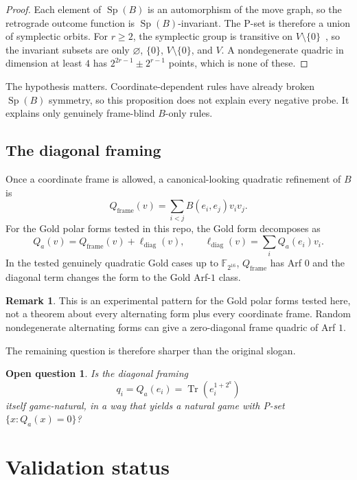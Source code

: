 \documentclass[11pt]{article}
\newtheorem*{question}{Open question}
\theoremstyle{definition}
\newtheorem{remark}{Remark}
\newcommand{\F}{\mathbb{F}}
\newcommand{\Tr}{\operatorname{Tr}}
\begin{document}
\begin{proof}
Each element of $\operatorname{Sp}(B)$ is an automorphism of the move graph, so
the retrograde outcome function is $\operatorname{Sp}(B)$-invariant. The P-set
is therefore a union of symplectic orbits. For $r\geq2$, the symplectic group is
transitive on $V\setminus\{0\}$~\cite{Taylor}, so the invariant subsets are only
$\varnothing$, $\{0\}$, $V\setminus\{0\}$, and $V$. A nondegenerate quadric in
dimension at least $4$ has $2^{2r-1}\pm2^{r-1}$ points, which is none of these.
\end{proof}

The hypothesis matters. Coordinate-dependent rules have already broken
$\operatorname{Sp}(B)$ symmetry, so this proposition does not explain every
negative probe. It explains only genuinely frame-blind $B$-only rules.

\subsection{The diagonal framing}

Once a coordinate frame is allowed, a canonical-looking quadratic refinement of
$B$ is
\[
  Q_{\mathrm{frame}}(v)=\sum_{i<j}B(e_i,e_j)v_i v_j.
\]
For the Gold polar forms tested in this repo, the Gold form decomposes as
\[
  Q_a(v)=Q_{\mathrm{frame}}(v)+\ell_{\mathrm{diag}}(v),
  \qquad
  \ell_{\mathrm{diag}}(v)=\sum_i Q_a(e_i)v_i.
\]
In the tested genuinely quadratic Gold cases up to $\F_{2^{16}}$,
$Q_{\mathrm{frame}}$ has Arf $0$ and the diagonal term changes the form to the
Gold Arf-$1$ class.

\begin{remark}
This is an experimental pattern for the Gold polar forms tested here, not a
theorem about every alternating form plus every coordinate frame. Random
nondegenerate alternating forms can give a zero-diagonal frame quadric of Arf
$1$.
\end{remark}

The remaining question is therefore sharper than the original slogan.

\begin{question}
Is the diagonal framing
\[
  q_i=Q_a(e_i)=\Tr(e_i^{1+2^a})
\]
itself game-natural, in a way that yields a natural game with P-set
$\{x:Q_a(x)=0\}$?
\end{question}

\section{Validation status}
\end{document}
